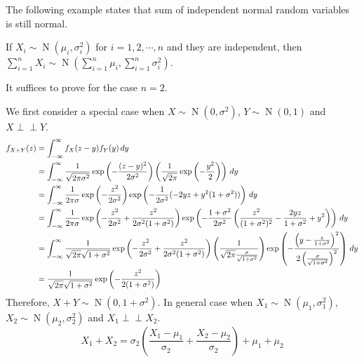 \documentclass{huhtakm-template-book}
\newcommand{\independent}{\perp\!\!\!\perp}
\DeclareMathOperator{\N}{N}
\begin{document}
    The following example states that sum of independent normal random variables is still normal.
    \begin{eg}
        If $X_{i}\sim\N(\mu_{i},\sigma_{i}^{2})$ for $i=1,2,\cdots,n$ and they are independent, then $\sum_{i=1}^{n}X_{i}\sim\N\left(\sum_{i=1}^{n}\mu_{i},\sum_{i=1}^{n}\sigma_{i}^{2}\right)$.
    \end{eg}
    
    \newpage
    \begin{cla}
        It suffices to prove for the case $n=2$.
    \end{cla}
    \begin{proofing}
        We first consider a special case when $X\sim\N(0,\sigma^{2})$, $Y\sim\N(0,1)$ and $X\independent Y$.
        \begin{align*}
            f_{X+Y}(z)&=\int_{-\infty}^{\infty} f_{X}(z-y)f_{Y}(y)\,dy\\
            &=\int_{-\infty}^{\infty}\frac{1}{\sqrt{2\pi\sigma^{2}}}\exp\left(-\frac{(z-y)^{2}}{2\sigma^{2}}\right)\left(\frac{1}{\sqrt{2\pi}}\exp\left(-\frac{y^{2}}{2}\right)\right)\,dy\\
            &=\int_{-\infty}^{\infty}\frac{1}{2\pi\sigma}\exp\left(-\frac{z^{2}}{2\sigma^{2}}\right)\exp\left(-\frac{1}{2\sigma^{2}}(-2yz+y^{2}(1+\sigma^{2}))\right)\,dy\\
            &=\int_{-\infty}^{\infty}\frac{1}{2\pi\sigma}\exp\left(-\frac{z^{2}}{2\sigma^{2}}+\frac{z^{2}}{2\sigma^{2}(1+\sigma^{2})}\right)\exp\left(-\frac{1+\sigma^{2}}{2\sigma^{2}}\left(\frac{z^{2}}{(1+\sigma^{2})^{2}}-\frac{2yz}{1+\sigma^{2}}+y^{2}\right)\right)\,dy\\
            &=\int_{-\infty}^{\infty}\frac{1}{\sqrt{2\pi}\sqrt{1+\sigma^{2}}}\exp\left(-\frac{z^{2}}{2\sigma^{2}}+\frac{z^{2}}{2\sigma^{2}(1+\sigma^{2})}\right)\left(\frac{1}{\sqrt{2\pi}\frac{\sigma}{\sqrt{1+\sigma^{2}}}}\right)\exp\left(-\frac{\left(y-\frac{z}{1+\sigma^{2}}\right)^{2}}{2\left(\frac{\sigma}{\sqrt{1+\sigma^{2}}}\right)^{2}}\right)\,dy\\
            &=\frac{1}{\sqrt{2\pi}\sqrt{1+\sigma^{2}}}\exp\left(-\frac{z^{2}}{2(1+\sigma^{2})}\right)
        \end{align*}
        Therefore, $X+Y\sim\N(0,1+\sigma^{2})$. In general case when $X_{1}\sim\N(\mu_{1},\sigma_{1}^{2})$, $X_{2}\sim\N(\mu_{2},\sigma_{2}^{2})$ and $X_{1}\independent X_{2}$.
        \begin{equation*}
            X_{1}+X_{2}=\sigma_{2}\left(\frac{X_{1}-\mu_{1}}{\sigma_{2}}+\frac{X_{2}-\mu_{2}}{\sigma_{2}}\right)+\mu_{1}+\mu_{2}
        \end{equation*}

\end{proofing}
\end{document}
